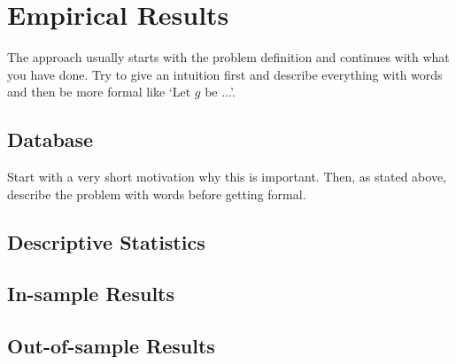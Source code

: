 \chapter{Empirical Results}\label{chap:mainresults}
The approach usually starts with the problem definition and continues with what you have done. Try to give an intuition first and describe everything with words and then be more formal like `Let $g$ be ...'.

\section{Database}
Start with a very short motivation why this is important. Then, as stated above, describe the problem with words before getting formal.

\section{Descriptive Statistics}

\section{In-sample Results}

\section{Out-of-sample Results}